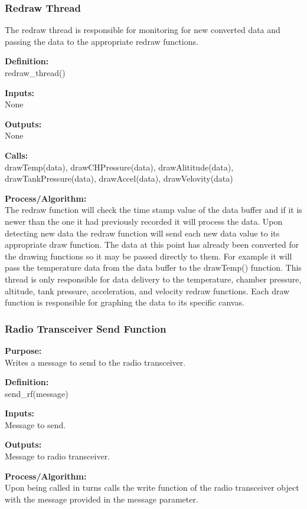 \documentclass[10pt,draftclsnofoot,onecolumn,compsoc]{IEEEtran}
\begin{document}
\subsubsection{Redraw Thread}
The redraw thread is responsible for monitoring for new converted data and passing the data to the appropriate redraw functions.\par
{\bf Definition:} \\
redraw\_thread() \par
{\bf Inputs:} \\  None \par
{\bf Outputs:} \\ None \par
{\bf Calls:} \\ drawTemp(data), drawCHPressure(data), drawAlititude(data), drawTankPressure(data), drawAccel(data), drawVelovity(data) \par
{\bf Process/Algorithm:} \\
The redraw function will check the time stamp value of the data buffer and if it is newer than the one it had previously recorded it will process the data. Upon detecting new data the redraw function will send each new data value to its appropriate draw function. The data at this point has already been converted for the drawing functions so it may be passed directly to them. For example it will pass the temperature data from the data buffer to the drawTemp() function. This thread is only responsible for data delivery to the temperature, chamber pressure, altitude, tank pressure, acceleration, and velocity redraw functions. Each draw function is responsible for graphing the data to its specific canvas.\par
\subsubsection{Radio Transceiver Send Function}
{\bf Purpose:} \\
Writes a message to send to the radio transceiver. \par
{\bf Definition:} \\ 
send\_rf(message) \par
{\bf Inputs:} \\  Message to send. \par
{\bf Outputs:} \\ Message to radio transceiver. \par
{\bf Process/Algorithm:} \\
Upon being called in turns calls the write function of the radio transceiver object with the message provided in the message parameter. \par
\end{document}
